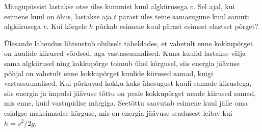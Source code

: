 
Mängupüssist lastakse otse üles kummist kuul algkiirusega $v$. Sel ajal, kui esimene kuul on õhus, lastakse aja $t$ pärast üles teine samasugune kuul samuti algkiirusega $v$. Kui kõrgele $h$ põrkab esimene kuul pärast esimest elastset põrget?


\hint
Ülesande lahendus lihtsustub oluliselt täheldades, et vahetult enne kokkupõrget on kuulide kiirused võrdsed, aga vastassuunalised.\solu
Kuna kuulid lastakse välja sama algkiirusel ning kokkupõrge toimub ühel kõrgusel, siis energia jäävuse põhjal on vahetult enne kokkupõrget kuulide kiirused samad, kuigi vastassuunalised. Kui põrkuvad kokku kaks ühesugust kuuli samade kiirustega, siis energia ja impulsi jäävuse tõttu on peale kokkupõrget nende kiirused samad, mis enne, kuid vastupidise märgiga. Seetõttu saavutab esimene kuul jälle oma esialgse maksimaalse kõrguse, mis on energia jäävuse seadusest leitav kui $h=v^2/2g$.

